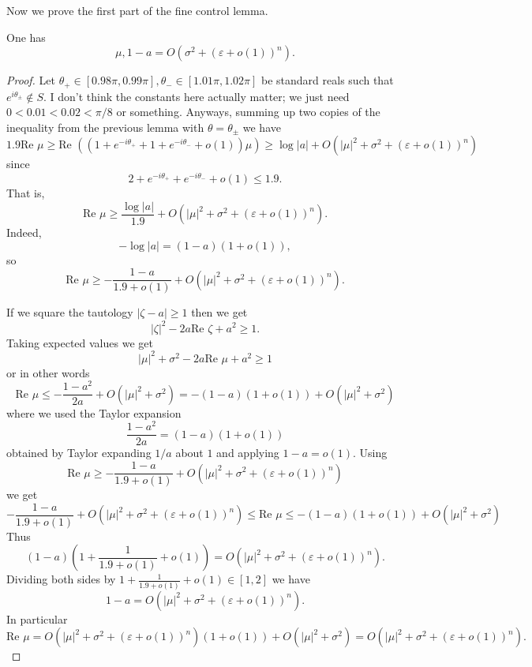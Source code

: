 \documentclass[12pt]{article}
\begin{document}
Now we prove the first part of the fine control lemma.
\begin{lemma}
One has
$$\mu, 1 - a = O(\sigma^2 + (\varepsilon + o(1))^n).$$
\end{lemma}
\begin{proof}
Let $\theta_+ \in [0.98\pi, 0.99\pi],\theta_- \in [1.01\pi, 1.02\pi]$ be standard reals such that $e^{i\theta_\pm} \notin S$.
I don't think the constants here actually matter; we just need $0 < 0.01 < 0.02 < \pi/8$ or something.
Anyways, summing up two copies of the inequality from the previous lemma with $\theta = \theta_\pm$ we have
$$1.9 \text{Re } \mu \geq \text{Re } ((1 + e^{-i\theta_+} + 1 + e^{-i\theta_-} + o(1))\mu) \geq \log |a| + O(|\mu|^2 + \sigma^2 + (\varepsilon + o(1))^n)$$
since
$$2 + e^{-i\theta_+} + e^{-i\theta_-} + o(1) \leq 1.9.$$
That is,
$$\text{Re } \mu \geq \frac{\log|a|}{1.9} + O(|\mu|^2 + \sigma^2 + (\varepsilon + o(1))^n).$$
Indeed,
$$-\log |a| = (1 - a)(1 + o(1)),$$
so
$$\text{Re }\mu \geq -\frac{1 - a}{1.9 + o(1)} + O(|\mu|^2 + \sigma^2 + (\varepsilon + o(1))^n).$$

If we square the tautology $|\zeta - a| \geq 1$ then we get
$$|\zeta|^2 - 2a \text{Re }\zeta + a^2 \geq 1.$$
Taking expected values we get
$$|\mu|^2 + \sigma^2 - 2a \text{Re }\mu + a^2 \geq 1$$
or in other words
$$\text{Re }\mu \leq -\frac{1 - a^2}{2a} + O(|\mu|^2 + \sigma^2) = -(1 - a)(1 + o(1)) + O(|\mu|^2 + \sigma^2)$$
where we used the Taylor expansion
$$\frac{1 - a^2}{2a} = (1 - a)(1 + o(1))$$
obtained by Taylor expanding $1/a$ about $1$ and applying $1 - a = o(1)$.
Using
$$\text{Re }\mu \geq -\frac{1 - a}{1.9 + o(1)} + O(|\mu|^2 + \sigma^2 + (\varepsilon + o(1))^n)$$
we get
$$-\frac{1 - a}{1.9 + o(1)} + O(|\mu|^2 + \sigma^2 + (\varepsilon + o(1))^n) \leq \text{Re }\mu \leq -(1 - a)(1 + o(1)) + O(|\mu|^2 + \sigma^2)$$
Thus
$$(1 - a)\left(1 + \frac{1}{1.9 + o(1)} + o(1)\right) = O(|\mu|^2 + \sigma^2 + (\varepsilon + o(1))^n).$$
Dividing both sides by $1 + \frac{1}{1.9 + o(1)} + o(1) \in [1, 2]$ we have
$$1 - a = O(|\mu|^2 + \sigma^2 + (\varepsilon + o(1))^n).$$
In particular
$$\text{Re }\mu = O(|\mu|^2 + \sigma^2 + (\varepsilon + o(1))^n)(1 + o(1)) + O(|\mu|^2 + \sigma^2) = O(|\mu|^2 + \sigma^2 + (\varepsilon + o(1))^n).$$


\end{proof}
\end{document}
